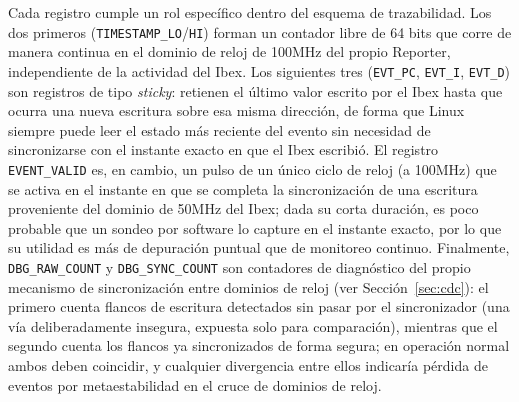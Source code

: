 Cada registro cumple un rol específico dentro del esquema de
trazabilidad. Los dos primeros (\texttt{TIMESTAMP\_LO}/\texttt{HI})
forman un contador libre de 64 bits que corre de manera continua en el
dominio de reloj de 100MHz del propio Reporter, independiente de la
actividad del Ibex. Los siguientes tres (\texttt{EVT\_PC},
\texttt{EVT\_I}, \texttt{EVT\_D}) son registros de tipo \textit{sticky}:
retienen el último valor escrito por el Ibex hasta que ocurra una nueva
escritura sobre esa misma dirección, de forma que Linux siempre puede leer
el estado más reciente del evento sin necesidad de sincronizarse con el
instante exacto en que el Ibex escribió. El registro \texttt{EVENT\_VALID}
es, en cambio, un pulso de un único ciclo de reloj (a 100MHz) que se activa
en el instante en que se completa la sincronización de una escritura
proveniente del dominio de 50MHz del Ibex; dada su corta duración, es
poco probable que un sondeo por software lo capture en el instante exacto,
por lo que su utilidad es más de depuración puntual que de monitoreo
continuo. Finalmente, \texttt{DBG\_RAW\_COUNT} y \texttt{DBG\_SYNC\_COUNT}
son contadores de diagnóstico del propio mecanismo de sincronización entre
dominios de reloj (ver Sección~\ref{sec:cdc}): el primero cuenta flancos
de escritura detectados sin pasar por el sincronizador (una vía
deliberadamente insegura, expuesta solo para comparación), mientras que el
segundo cuenta los flancos ya sincronizados de forma segura; en operación
normal ambos deben coincidir, y cualquier divergencia entre ellos indicaría
pérdida de eventos por metaestabilidad en el cruce de dominios de reloj.

